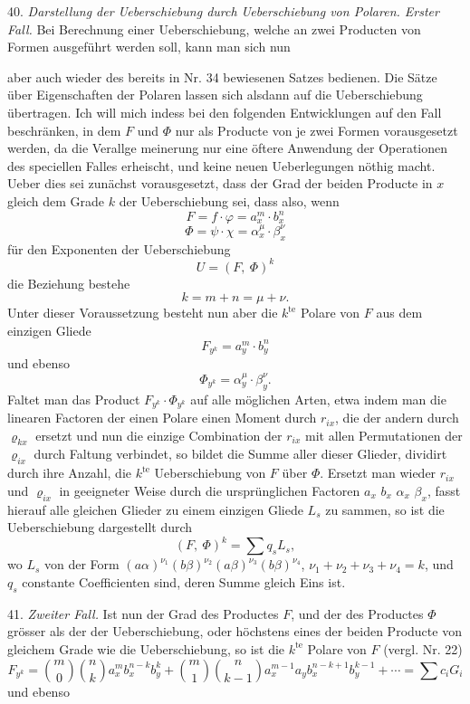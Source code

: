 40. \textit{Darstellung der Ueberschiebung durch Ueberschiebung von
Polaren. Erster Fall.} Bei Berechnung einer Ueberschiebung, welche
an zwei Producten von Formen ausgeführt werden soll, kann man
sich nun


aber auch wieder des bereits in Nr. 34 bewiesenen Satzes bedienen.
Die Sätze über Eigenschaften der Polaren lassen sich alsdann auf die
Ueberschiebung übertragen. Ich will mich indess bei den folgenden
Entwicklungen auf den Fall beschränken, in dem $F$ und $\Phi$ nur als
Producte von je zwei Formen vorausgesetzt werden, da die Verallge\-
meinerung nur eine öftere Anwendung der Operationen des speciellen
Falles erheischt, und keine neuen Ueberlegungen nöthig macht. Ueber\-
dies sei zunächst vorausgesetzt, dass der Grad der beiden Producte
in $x$ gleich dem Grade $k$ der Ueberschiebung sei, dass also, wenn
\[
F = f\cdot\varphi = a_x^m\cdot b_x^n
\]
\[
\Phi = \psi\cdot\chi = \alpha_x^\mu\cdot\beta_x^\nu
\]
für den Exponenten der Ueberschiebung
\[
U = (F,\ \Phi)^k
\]
die Beziehung bestehe
\[
k = m+n = \mu+\nu.
\]
Unter dieser Voraussetzung besteht nun aber die $k^{\text{te}}$ Polare von
$F$ aus dem einzigen Gliede
\[
F_{y^k} = a_y^m\cdot b_y^n
\]
und ebenso
\[
\Phi_{y^k} = \alpha_y^\mu\cdot\beta_y^\nu.
\]
Faltet man das Product $F_{y^k}\cdot \Phi_{y^k}$ auf alle möglichen Arten, etwa
indem man die linearen Factoren der einen Polare einen Moment durch
$r_{ix}$, die der andern durch $\varrho_{kx}$ ersetzt und nun die einzige Combination
der $r_{ix}$ mit allen Permutationen der $\varrho_{ix}$ durch Faltung verbindet, so
bildet die Summe aller dieser Glieder, dividirt durch ihre Anzahl, die
$k^{\text{te}}$ Ueberschiebung von $F$ über $\Phi$. Ersetzt man wieder $r_{ix}$ und $\varrho_{ix}$
in geeigneter Weise durch die ursprünglichen Factoren $a_x$ $b_x$ $\alpha_x$ $\beta_x$,
fasst hierauf alle gleichen Glieder zu einem einzigen Gliede $L_s$ zu\-
sammen, so ist die Ueberschiebung dargestellt durch
\[
(F,\ \Phi)^k = \sum q_s L_s,
\]
wo $L_s$ von der Form $(a\alpha)^{\nu_1}(b\beta)^{\nu_2}(a\beta)^{\nu_3}(b\beta)^{\nu_4}$, $\nu_1+\nu_2+\nu_3+\nu_4=k$,
und $q_s$ constante Coefficienten sind, deren Summe gleich Eins ist.

41. \textit{Zweiter Fall.} Ist nun der Grad des Productes $F$, und der
des Productes $\Phi$ grösser als der der Ueberschiebung, oder höchstens
eines der beiden Producte von gleichem Grade wie die Ueberschiebung,
so ist die $k^{\text{te}}$ Polare von $F$ (vergl. Nr. 22)
\[
F_{y^k} = \binom{m}{0}\binom{n}{k} a_x^m b_x^{n-k} b_y^k + \binom{m}{1}\binom{n}{k-1} a_x^{m-1} a_y b_x^{n-k+1} b_y^{k-1} + \cdots = \sum c_i G_i
\]
und ebenso


